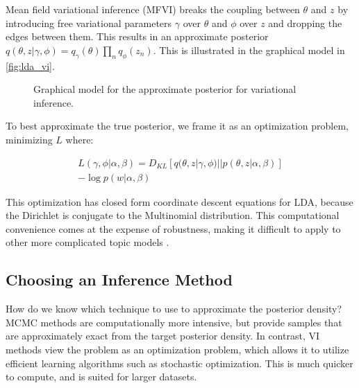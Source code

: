 \documentclass[letterpaper]{article}
\begin{document}
Mean field variational inference (MFVI) breaks the coupling between
$\theta$ and $z$ by introducing free variational parameters $\gamma$
over $\theta$ and $\phi$ over $z$ and dropping the edges between them.
This results in an approximate posterior $q(\theta, z | \gamma, \phi)
= q_\gamma(\theta)\prod_nq_\phi(z_n)$. This is illustrated in the
graphical model in \autoref{fig:lda_vi}.

\begin{figure}[ht]
  \centering
  \caption{\label{fig:lda_vi} Graphical model for the approximate
    posterior for variational inference.}
\end{figure}

To best approximate the true posterior, we frame it as an optimization
problem, minimizing $L$ where:

\begin{multline}
L(\gamma, \phi | \alpha, \beta) = D_{KL}\left[ q(\theta, z | \gamma,
  \phi) || p(\theta, z | \alpha, \beta) \right] \\
- \log p(w | \alpha, \beta)
\end{multline}

This optimization has closed form coordinate descent equations for
LDA, because the Dirichlet is conjugate to the Multinomial
distribution. This computational convenience comes at the expense of
robustness, making it difficult to apply to other more complicated
topic models \cite{blei2003latent}.

\subsection{Choosing an Inference Method}
\label{sub:choosing-inference}
How do we know which technique to use to approximate the posterior
density? MCMC methods are computationally more intensive, but provide
samples that are approximately exact from the target posterior
density. In contrast, VI methods view the problem as an optimization
problem, which allows it to utilize efficient learning algorithms such
as stochastic optimization. This is much quicker to compute, and is
suited for larger datasets.
\end{document}
